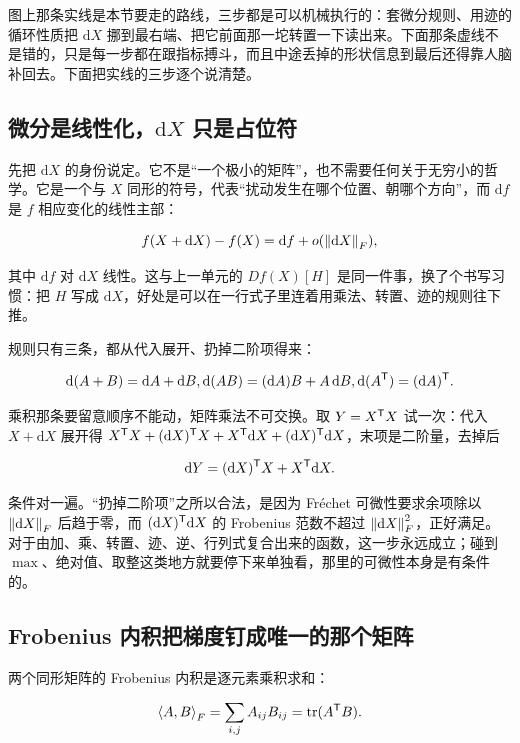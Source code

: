 图上那条实线是本节要走的路线，三步都是可以机械执行的：套微分规则、用迹的循环性质把 \(\mathrm dX\) 挪到最右端、把它前面那一坨转置一下读出来。下面那条虚线不是错的，只是每一步都在跟指标搏斗，而且中途丢掉的形状信息到最后还得靠人脑补回去。下面把实线的三步逐个说清楚。

\subsection{微分是线性化，\(\mathrm dX\) 只是占位符}

先把 \(\mathrm dX\) 的身份说定。它不是``一个极小的矩阵''，也不需要任何关于无穷小的哲学。它是一个与 \(X\) 同形的符号，代表``扰动发生在哪个位置、朝哪个方向''，而 \(\mathrm df\) 是 \(f\) 相应变化的线性主部：

\[
f(X+\mathrm dX)-f(X)=\mathrm df+o(\left\lVert\mathrm dX\right\rVert_F),
\]

其中 \(\mathrm df\) 对 \(\mathrm dX\) 线性。这与上一单元的 \(Df(X)[H]\) 是同一件事，换了个书写习惯：把 \(H\) 写成 \(\mathrm dX\)，好处是可以在一行式子里连着用乘法、转置、迹的规则往下推。

规则只有三条，都从代入展开、扔掉二阶项得来：

\[
\mathrm d(A+B)=\mathrm dA+\mathrm dB,
\space
\mathrm d(AB)=(\mathrm dA)B+A\,\mathrm dB,
\space
\mathrm d(A^{\mathsf{T}})=(\mathrm dA)^{\mathsf{T}}.
\]

乘积那条要留意顺序不能动，矩阵乘法不可交换。取 \(Y=X^{\mathsf{T}}X\) 试一次：代入 \(X+\mathrm dX\) 展开得 \(X^{\mathsf{T}}X+(\mathrm dX)^{\mathsf{T}}X+X^{\mathsf{T}}\mathrm dX+(\mathrm dX)^{\mathsf{T}}\mathrm dX\)，末项是二阶量，去掉后

\[
\mathrm dY=(\mathrm dX)^{\mathsf{T}}X+X^{\mathsf{T}}\mathrm dX.
\]

条件对一遍。``扔掉二阶项''之所以合法，是因为 Fréchet 可微性要求余项除以 \(\left\lVert\mathrm dX\right\rVert_F\) 后趋于零，而 \((\mathrm dX)^{\mathsf{T}}\mathrm dX\) 的 Frobenius 范数不超过 \(\left\lVert\mathrm dX\right\rVert_F^2\)，正好满足。对于由加、乘、转置、迹、逆、行列式复合出来的函数，这一步永远成立；碰到 \(\max\)、绝对值、取整这类地方就要停下来单独看，那里的可微性本身是有条件的。

\subsection{Frobenius 内积把梯度钉成唯一的那个矩阵}

两个同形矩阵的 Frobenius 内积是逐元素乘积求和：

\[
\left\langle A,B\right\rangle_F=\sum_{i,j}A_{ij}B_{ij}=\operatorname{tr}(A^{\mathsf{T}}B).
\]

